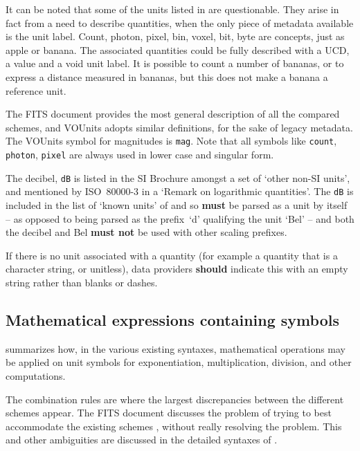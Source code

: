 \documentclass[11pt,a4paper]{ivoa}
\newcommand{\unit}[1]{\texttt{\small\color{orange}#1}}
\newcommand*\norm[1]{\textbf{\color{ivoacolor}#1}}
\begin{document}
It can be noted that some of the units listed in  are
questionable. They arise in fact from a need to describe quantities, when the only
piece of metadata available is the unit label. Count, photon, pixel, bin, voxel, bit,
byte are concepts, just as apple or banana. The associated quantities could be fully
described with a UCD, a value and a void unit label.
It is possible to count a number of bananas, or to express a distance measured in
bananas, but this does not make a banana a reference unit.

The FITS document provides the most general description of all the compared schemes,
and VOUnits adopts similar definitions, for the sake of legacy metadata.
The VOUnits symbol for magnitudes is \unit{mag}.
Note that all symbols like \unit{count}, \unit{photon}, \unit{pixel}
are always used in lower case and singular form.

The decibel, \unit{dB} is listed in the SI Brochure
\citep[Table 8]{si-brochure} amongst a set of `other non-SI units',
and mentioned by ISO~80000-3 \citep[\S0.5]{std:iso80000-3} in a `Remark on
logarithmic quantities'.  The \unit{dB} is included in the list of
`known units' of  and so \norm{must} be parsed as a
unit by itself -- as opposed to being parsed as the prefix~`d'
qualifying the unit `Bel' -- and both the decibel and Bel \norm{must
not} be used with other scaling prefixes.

If there is no unit associated with a quantity (for example a quantity
that is a character string, or unitless), data providers \norm{should}
indicate this with an empty string rather than blanks or dashes.



\subsection{Mathematical expressions containing symbols\label{sec:math}}

 summarizes how,
in the various existing syntaxes, mathematical operations may
be applied on unit symbols for exponentiation, multiplication,
division, and other computations.

The combination rules are where the largest discrepancies between the
different schemes appear. The FITS document discusses the problem of
trying to best accommodate the existing schemes
\cite[\S4.3.1]{pence10}, without really resolving the problem.
\label{sec:fitsquote}
This and other ambiguities are discussed in the detailed syntaxes of .
\end{document}
